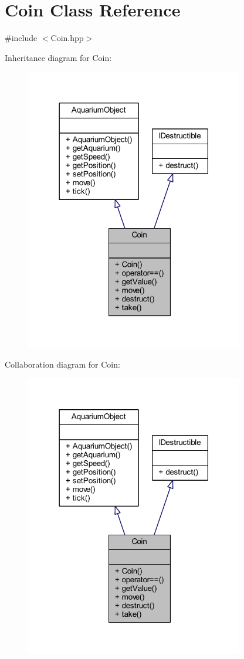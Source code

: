 \hypertarget{class_coin}{}\section{Coin Class Reference}
\label{class_coin}


{\ttfamily \#include $<$Coin.\+hpp$>$}



Inheritance diagram for Coin\+:\nopagebreak
\begin{figure}[H]
\begin{center}
\leavevmode
\includegraphics[width=270pt]{class_coin__inherit__graph}
\end{center}
\end{figure}


Collaboration diagram for Coin\+:\nopagebreak
\begin{figure}[H]
\begin{center}
\leavevmode
\includegraphics[width=270pt]{class_coin__coll__graph}
\end{center}
\end{figure}
